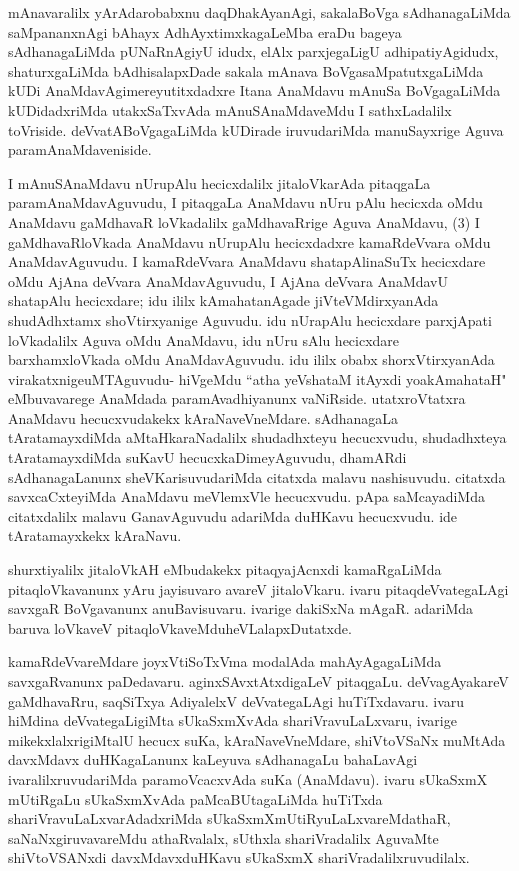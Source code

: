 \begin{artha}
mAnavaralilx yArAdarobabxnu daqDhakAyanAgi, sakalaBoVga sAdhanagaLiMda saMpananxnAgi bAhayx AdhAyxtimxkagaLeMba eraDu bageya sAdhanagaLiMda pUNaRnAgiyU idudx, elAlx parxjegaLigU adhipatiyAgidudx, shaturxgaLiMda bAdhisalapxDade sakala mAnava BoVga\break saMpatutxgaLiMda kUDi AnaMdavAgimereyutitxdadxre Itana AnaMdavu mAnuSa BoVgagaLiMda kUDidadxriMda utakxSaTxvAda mAnuSAnaMdaveMdu I sathxLadalilx toVriside. deVvatABoVgagaLiMda kUDirade iruvudariMda manuSayxrige Aguva paramAnaMdaveniside. 
\end{artha}

\begin{artha}
I mAnuSAnaMdavu nUrupAlu hecicxdalilx jitaloVkarAda pitaqgaLa paramAnaMdavAguvudu, I pitaqgaLa AnaMdavu nUru pAlu hecicxda oMdu AnaMdavu gaMdhavaR loVkadalilx gaMdhavaRrige Aguva AnaMdavu, (3) I gaMdhavaRloVkada AnaMdavu nUrupAlu hecicxdadxre kamaRdeVvara oMdu AnaMdavAguvudu. I kamaRdeVvara AnaMdavu shatapAlinaSuTx hecicxdare oMdu AjAna deVvara AnaMdavAguvudu, I AjAna deVvara AnaMdavU shatapAlu hecicxdare; idu ililx kAmahatanAgade jiVteVMdirxyanAda shudAdhxtamx shoVtirxyanige Aguvudu. idu nUrapAlu hecicxdare parxjApati loVkadalilx Aguva oMdu AnaMdavu, idu nUru sAlu hecicxdare barxhamxloVkada oMdu AnaMdavAguvudu. idu ililx obabx shorxVtirxyanAda virakatxnige\break uMTAguvudu- hiVgeMdu ``atha yeVshataM itAyxdi yo\break akAmahataH" eMbuvavarege AnaMdada paramAvadhiyanunx vaNiRside. utatxroVtatxra AnaMdavu hecucxvudakekx kAraNaveVneMdare. sAdhanagaLa tAratamayxdiMda aMtaHkaraNadalilx shudadhxteyu hecucxvudu, shudadhxteya tAratamayxdiMda suKavU hecucxkaDimeyAguvudu, dhamARdi sAdhanagaLanunx sheVKarisuvudariMda citatxda malavu nashisuvudu. citatxda savxcaCxteyiMda AnaMdavu meVlemxVle hecucxvudu. pApa saMcayadiMda citatxdalilx malavu GanavAguvudu adariMda duHKavu hecucxvudu. ide tAratamayxkekx kAraNavu. 
\end{artha}%
\newpage
\begin{artha}
shurxtiyalilx jitaloVkAH eMbudakekx pitaqyajAcnxdi kamaRgaLiMda pitaqloVkavanunx yAru jayisuvaro avareV jitaloVkaru. ivaru pitaqdeVvategaLAgi savxgaR BoVgavanunx anuBavisuvaru. ivarige dakiSxNa mAgaR. adariMda baruva loVkaveV pitaqloVkaveMdu\break heVLalapxDutatxde. 
\end{artha}

\begin{artha}
kamaRdeVvareMdare joyxVtiSoTxVma modalAda mahAyAgagaLiMda savxgaRvanunx paDedavaru. aginxSAvxtAtxdigaLeV pitaqgaLu. deVvagAyakareV gaMdhavaRru, saqSiTxya AdiyalelxV deVvategaLAgi huTiTxdavaru. ivaru hiMdina deVvategaLigiMta sUkaSxmXvAda shariVravuLaLxvaru, ivarige mikekxlalxrigiMtalU hecucx suKa, kAraNaveVneMdare, shiVtoVSaNx muMtAda davxMdavx duHKagaLanunx kaLeyuva sAdhanagaLu bahaLavAgi ivaralilxruvudariMda paramoVcacxvAda suKa (AnaMdavu). ivaru sUkaSxmX mUtiRgaLu sUkaSxmXvAda paMcaBUtagaLiMda huTiTxda shariVravuLaLxvarAdadxriMda sUkaSxmXmUtiRyuLaLxvareMdathaR, saNaNxgiruvava\-\break reMdu athaRvalalx, sUthxla shariVradalilx AguvaMte shiVtoVSANxdi davxMdavxduHKavu sUkaSxmX shariVradalilxruvudilalx. 
\end{artha}%

